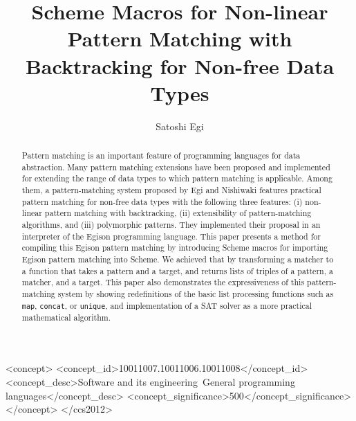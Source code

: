 \documentclass[acmlarge]{acmart}
\begin{document}
\setlength{\pdfpageheight}{\paperheight}
\setlength{\pdfpagewidth}{\paperwidth}

\title{Scheme Macros for Non-linear Pattern Matching with Backtracking for Non-free Data Types}

\author{Satoshi Egi}

\begin{abstract}
  Pattern matching is an important feature of programming languages for data abstraction.
  Many pattern matching extensions have been proposed and implemented for extending the range of data types to which pattern matching is applicable.
  Among them, a pattern-matching system proposed by Egi and Nishiwaki features practical pattern matching for non-free data types with the following three features: (i) non-linear pattern matching with backtracking, (ii) extensibility of pattern-matching algorithms, and (iii) polymorphic patterns.
  They implemented their proposal in an interpreter of the Egison programming language.
  This paper presents a method for compiling this Egison pattern matching by introducing Scheme macros for importing Egison pattern matching into Scheme.
  We achieved that by transforming a matcher to a function that takes a pattern and a target, and returns lists of triples of a pattern, a matcher, and a target.
  This paper also demonstrates the expressiveness of this pattern-matching system by showing redefinitions of the basic list processing functions such as \texttt{map}, \texttt{concat}, or \texttt{unique}, and implementation of a SAT solver as a more practical mathematical algorithm.
  
\end{abstract}

\begin{CCSXML}
<concept>
<concept_id>10011007.10011006.10011008</concept_id>
<concept_desc>Software and its engineering~General programming languages</concept_desc>
<concept_significance>500</concept_significance>
</concept>
</ccs2012>
\end{CCSXML}


\end{document}
